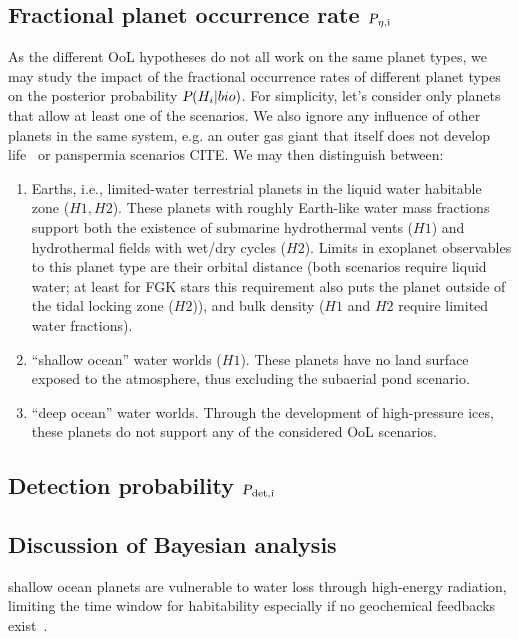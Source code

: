 \documentclass[twocolumn]{aastex631}
\begin{document}
\subsection{Fractional planet occurrence rate $\textsl{P}_\mathrm{\eta, i}$}
As the different OoL hypotheses do not all work on the same planet types, we may study the impact of the fractional occurrence rates of different planet types on the posterior probability $\textsl{P}(H_i|bio)$.
For simplicity, let's consider only planets that allow at least one of the scenarios.
We also ignore any influence of other planets in the same system, e.g. an outer gas giant that itself does not develop life~\citep{Schlecker2021a} or panspermia scenarios CITE.
We may then distinguish between:
\begin{enumerate}
    \item Earths, i.e., limited-water terrestrial planets in the liquid water habitable zone ($H1, H2$). These planets with roughly Earth-like water mass fractions support both the existence of submarine hydrothermal vents ($H1$) and hydrothermal fields with wet/dry cycles ($H2$). Limits in exoplanet observables to this planet type are their orbital distance (both scenarios require liquid water; at least for FGK stars this requirement also puts the planet outside of the tidal locking zone ($H2$)), and bulk density ($H1$ and $H2$ require limited water fractions).
    \item ``shallow ocean'' water worlds ($H1$). These planets have no land surface exposed to the atmosphere, thus excluding the subaerial pond scenario.
    \item ``deep ocean'' water worlds. Through the development of high-pressure ices, these planets do not support any of the considered OoL scenarios.
\end{enumerate}





\subsection{Detection probability $\textsl{P}_\mathrm{det, i}$}



\subsection{Discussion of Bayesian analysis}

\begin{note}
    shallow ocean planets are vulnerable to water loss through high-energy radiation, limiting the time window for habitability especially if no geochemical feedbacks exist~\citep{Kite2018}.
\end{note}
\end{document}
